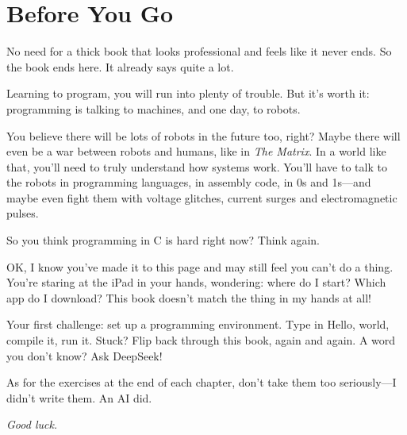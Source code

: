 \chapter*{Before You Go}

No need for a thick book that looks professional and feels like it never ends. So the book ends here. It already says quite a lot.

Learning to program, you will run into plenty of trouble. But it's worth it: programming is talking to machines, and one day, to robots.

You believe there will be lots of robots in the future too, right? Maybe there will even be a war between robots and humans, like in \emph{The Matrix}. In a world like that, you'll need to truly understand how systems work. You'll have to talk to the robots in programming languages, in assembly code, in 0s and 1s---and maybe even fight them with voltage glitches, current surges and electromagnetic pulses.

So you think programming in C is hard right now? Think again.

\bigskip

OK, I know you've made it to this page and may still feel you can't do a thing. You're staring at the iPad in your hands, wondering: where do I start? Which app do I download? This book doesn't match the thing in my hands at all!

Your first challenge: set up a programming environment. Type in Hello, world, compile it, run it. Stuck? Flip back through this book, again and again. A word you don't know? Ask DeepSeek!

\begin{center}
\end{center}

As for the exercises at the end of each chapter, don't take them too seriously---I didn't write them. An AI did.

\vspace{2em}
\begin{flushright}
  {\large\itshape Good luck.}
\end{flushright}
